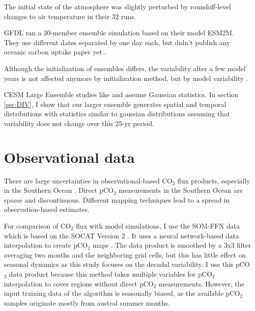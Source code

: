 The initial state of the atmosphere was slightly perturbed by roundoff-level changes to air temperature in their 32 runs. 

\ac{GFDL} ran a 30-member ensemble simulation based on their model ESM2M. They use different dates separated by one day each, but didn't publish any oceanic carbon uptake paper yet \citep{Rodgers2015}.

Although the initialization of ensembles differs, the variability after a few model years is not affected anymore by initialization method, but by model variability \citep{Hawkins2009}.

\acs{CESM} Large Ensemble studies like \cite{Deser2012} and \cite{Thompson2015} assume Gaussian statistics. In section \ref{sec:DIV}, I show that our larger ensemble generates spatial and temporal distributions with statistics similar to gaussian distributions assuming that variability does not change over this 25-yr period.








\section{Observational data}
There are large uncertainties in observational-based CO$_2$ flux products, especially in the Southern Ocean \citep{Roedenbeck2015}. Direct pCO$_2$ measurements in the Southern Ocean are sparse and discontinuous. Different mapping techniques lead to a spread in observation-based estimates.

For comparison of CO$_2$ flux with model simulations, I use the \ac{SOM-FFN} data which is based on the \ac{SOCAT} Version 2 \citep{Bakker2014}. It uses a neural network-based data interpolation to create pCO$_2$ maps \citep{Landschuetzer2014}. The data product is smoothed by a 3x3 filter averaging two months and the neighboring grid cells, but this has little effect on seasonal dynamics as this study focuses on the decadal variability. I use this pCO$_2$ data product because this method takes multiple variables for pCO$_2$ interpolation to cover regions without direct pCO$_2$ measurements. However, the input training data of the algorithm is seasonally biased, as the available pCO$_2$ samples originate mostly from austral summer months.

